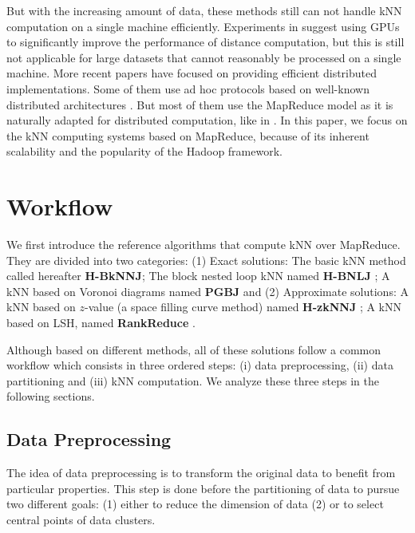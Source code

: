 \documentclass[10pt,journal,compsoc]{IEEEtran}
\begin{document}
But with the increasing amount of data, these methods still can not handle kNN computation 
on a single machine efficiently. Experiments in \cite{10.1371/journal.pone.0044000} suggest using GPUs to significantly improve the 
performance of distance computation, but this is still not applicable for large datasets that cannot reasonably be 
processed on a single machine. 
More recent papers have focused on providing efficient distributed implementations. Some of 
them use ad hoc protocols based on well-known distributed architectures \cite{Novak:2006:MSD:1146847.1146866,Haghani_lshat}. But most of them 
use the MapReduce model as it is naturally adapted for distributed computation, like in \cite{Stupar10rankreduce-,Lu:2012:EPK:2336664.2336674,Zhang:2012:EPK:2247596.2247602}. In this paper, we focus on the kNN computing systems based on MapReduce, because of its 
inherent scalability and the popularity of the Hadoop framework.
%
\section{Workflow}\label{workflowsec}
We first introduce the reference algorithms that compute kNN over MapReduce. They are divided into two categories: (1) Exact solutions:  The basic kNN method called hereafter \textbf{H-BkNNJ}; The block nested loop kNN named \textbf{H-BNLJ} \cite{Zhang:2012:EPK:2247596.2247602}; A kNN based on Voronoi diagrams named \textbf{PGBJ} \cite{Lu:2012:EPK:2336664.2336674} and (2) Approximate solutions:  A kNN based on $z$-value (a space filling curve method) named \textbf{H-zkNNJ} \cite{Zhang:2012:EPK:2247596.2247602};  A kNN based on LSH, named \textbf{RankReduce} \cite{Stupar10rankreduce-}.

Although based on different methods, all of these solutions follow a common workflow which consists in three ordered steps: (i) data preprocessing, (ii) data partitioning and (iii) kNN computation. We analyze these three steps in the following sections.
%
\subsection{Data Preprocessing}\label{data_preprocessing}
The idea of data preprocessing is to transform the original data to benefit from particular properties. This step is 
done before the partitioning of data to pursue two different goals: (1) either to reduce the dimension of data (2) or 
to select central points of data clusters. 
\end{document}
